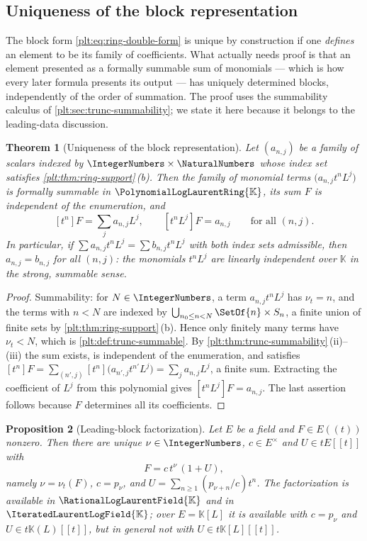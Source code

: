 \documentclass[11pt,oneside]{article}
\theoremstyle{plain}
\newtheorem{theorem}{Theorem}[section]
\newtheorem{proposition}[theorem]{Proposition}
\theoremstyle{definition}
\theoremstyle{remark}
\newcommand{\K}{\mathbb{K}}
\newcommand{\PLlau}{\PolynomialLogLaurentRing{\K}}       %
\newcommand{\PLrat}{\RationalLogLaurentField{\K}}        %
\newcommand{\PLit}{\IteratedLaurentLogField{\K}}         %
\newcommand{\ordt}{\nu_{t}}                              %
\begin{document}
\subsection{Uniqueness of the block representation}
\label{plt:sec:lead-uniqueness}

The block form \eqref{plt:eq:ring-double-form} is unique by construction if one
\emph{defines} an element to be its family of coefficients.  What actually
needs proof is that an element presented as a formally summable sum of
monomials --- which is how every later formula presents its output --- has
uniquely determined blocks, independently of the order of summation.  The
proof uses the summability calculus of \cref{plt:sec:trunc-summability}; we
state it here because it belongs to the leading-data discussion.

\begin{theorem}[Uniqueness of the block representation]
\label{plt:thm:lead-uniqueness}
Let \((a_{n,j})\) be a family of scalars indexed by
\(\IntegerNumbers\times\NaturalNumbers\) whose index set satisfies
\cref{plt:thm:ring-support}\,(b).  Then the family of monomial terms
\(\bigl(a_{n,j}t^nL^j\bigr)\) is formally summable in \(\PLlau\), its sum
\(F\) is independent of the enumeration, and
\[
  [t^n]F=\sum_{j}a_{n,j}L^j,
  \qquad
  [t^nL^j]F=a_{n,j}
  \qquad\text{for all }(n,j).
\]
In particular, if \(\sum a_{n,j}t^nL^j=\sum b_{n,j}t^nL^j\) with both index
sets admissible, then \(a_{n,j}=b_{n,j}\) for all \((n,j)\): the monomials
\(t^nL^j\) are linearly independent over \(\K\) in the strong, summable sense.
\end{theorem}

\begin{proof}
Summability: for \(N\in\IntegerNumbers\), a term \(a_{n,j}t^nL^j\) has
\(\ordt=n\), and the terms with \(n<N\) are indexed by
\(\bigcup_{n_0\le n<N}\SetOf{n}\times S_n\), a finite union of finite sets by
\cref{plt:thm:ring-support}\,(b).  Hence only finitely many terms have
\(\ordt<N\), which is
\cref{plt:def:trunc-summable}.  By
\cref{plt:thm:trunc-summability}\,(ii)--(iii) the sum exists, is independent
of the enumeration, and satisfies
\([t^n]F=\sum_{(n',j)}[t^n]\bigl(a_{n',j}t^{n'}L^j\bigr)
=\sum_ja_{n,j}L^j\), a finite sum.  Extracting the coefficient of \(L^j\) from
this polynomial gives \([t^nL^j]F=a_{n,j}\).  The last assertion follows
because \(F\) determines all its coefficients.
\end{proof}

\begin{proposition}[Leading-block factorization]
\label{plt:prop:lead-factorization}
Let \(E\) be a \emph{field} and \(F\in E((t))\) nonzero.  Then there are
unique \(\nu\in\IntegerNumbers\), \(c\in E^\times\) and \(U\in tE[[t]]\) with
\begin{equation}\label{plt:eq:lead-factorization}
  F=c\,t^{\nu}\,(1+U),
\end{equation}
namely \(\nu=\ordt(F)\), \(c=p_\nu\), and \(U=\sum_{n\ge1}(p_{\nu+n}/c)t^n\).
The factorization is available in \(\PLrat\) and in \(\PLit\); over
\(E=\K[L]\) it is available with \(c=p_\nu\) and \(U\in t\K(L)[[t]]\), but in
general \emph{not} with \(U\in t\K[L][[t]]\).
\end{proposition}
\end{document}
